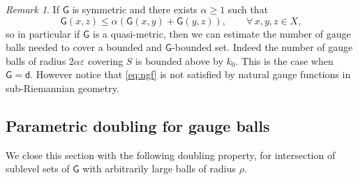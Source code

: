 \documentclass[11pt,a4paper]{article}
\theoremstyle{plain}
\theoremstyle{definition}
\theoremstyle{remark}
\newtheorem{remark}[theorem]{Remark}
\numberwithin{equation}{section}
\newcommand{\sfd}{\mathsf d}
\newcommand{\sfG}{\mathsf G}
\begin{document}
\begin{remark}
If $\sfG$ is symmetric and there exists $\alpha\geq 1$ such that 
\begin{equation}\label{eq:ngf}
\sfG(x,z)\leq \alpha(\sfG(x,y)+\sfG(y,z)),\qquad \forall\, x,y,z \in X,
\end{equation}
so in particular if $\sfG$ is a quasi-metric, then we can estimate the number of gauge balls needed to cover a bounded and $\sfG$-bounded set. Indeed the number of gauge balls of radius $2\alpha\varepsilon$ covering $S$ is bounded above by $k_0$. This is the case when $\sfG=\sfd$. However notice that \eqref{eq:ngf} is not satisfied by natural gauge functions in sub-Riemannian geometry.
\end{remark}
\subsection{Parametric doubling for gauge balls}

We close this section with the following doubling property, for intersection of sublevel sets of $\sfG$ with arbitrarily large balls of radius $\rho$.
 
\end{document}
